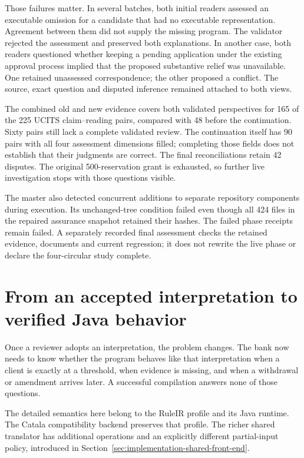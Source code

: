 \documentclass[12pt,a4paper,oneside,openany]{book}
\begin{document}
Those failures matter. In several batches, both initial readers assessed an
executable omission for a candidate that had no executable representation.
Agreement between them did not supply the missing program. The validator
rejected the assessment and preserved both explanations. In another case, both
readers questioned whether keeping a pending application under the existing
approval process implied that the proposed substantive relief was unavailable.
One retained unassessed correspondence; the other proposed a conflict. The
source, exact question and disputed inference remained attached to both views.

The combined old and new evidence covers both validated perspectives for 165
of the 225 UCITS claim--reading pairs, compared with 48 before the continuation.
Sixty pairs still lack a complete validated review. The continuation itself
has 90 pairs with all four assessment dimensions filled; completing those
fields does not establish that their judgments are correct. The final
reconciliations retain 42 disputes. The original 500-reservation grant is
exhausted, so further live investigation stops with those questions visible.

The master also detected concurrent additions to separate repository components
during execution. Its unchanged-tree condition failed even though all 424 files
in the repaired assurance snapshot retained their hashes. The failed phase
receipts remain failed. A separately recorded final assessment checks the
retained evidence, documents and current regression; it does not rewrite the
live phase or declare the four-circular study complete.

\chapter{From an accepted interpretation to verified Java behavior}
\label{ch:verification}

Once a reviewer adopts an interpretation, the problem changes. The bank now
needs to know whether the program behaves like that interpretation when a client
is exactly at a threshold, when evidence is missing, and when a withdrawal or
amendment arrives later. A successful compilation answers none of those
questions.

The detailed semantics here belong to the RuleIR profile and its Java runtime.
The Catala compatibility backend preserves that profile. The richer shared
translator has additional operations and an explicitly different partial-input
policy, introduced in Section~\ref{sec:implementation-shared-front-end}.
\end{document}
